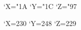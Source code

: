 %
%
%
%
%
%



\begingroup
\lccode`X="1A
\lccode`Y="1C
\lccode`Z="97 %

\endgroup

\begingroup
\lccode`X=230
\lccode`Y=248
\lccode`Z=229

\endgroup
\endinput

